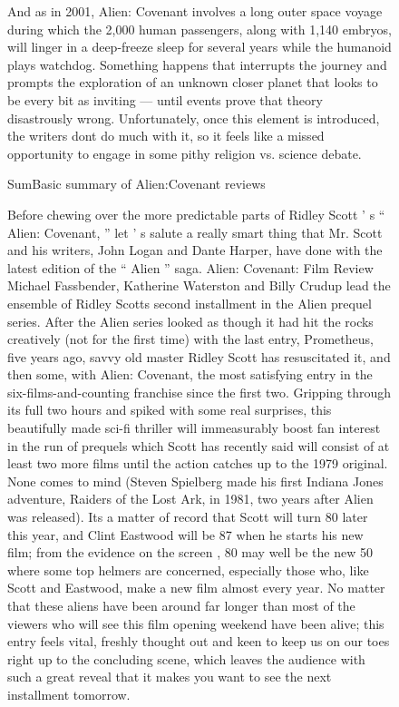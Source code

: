 \documentclass[../writeup.tex]{subfiles}
\begin{document}
\begin{figure}[h]
{        And as in 2001, Alien: Covenant involves a long outer space voyage during which the 2,000 human passengers, along with 1,140 embryos, will linger in a deep-freeze sleep for several years while the humanoid plays watchdog.
        Something happens that interrupts the journey and prompts the exploration of an unknown closer planet that looks to be every bit as inviting — until events prove that theory disastrously wrong.
        Unfortunately, once this element is introduced, the writers dont do much with it, so it feels like a missed opportunity to engage in some pithy religion vs. science debate.}
    \caption{SumBasic summary of Alien:Covenant reviews}
\end{figure}

\begin{figure}[h]
    {\small Before chewing over the more predictable parts of Ridley Scott ’ s “ Alien: Covenant, ” let ’ s salute a really smart thing that Mr. Scott and his writers, John Logan and Dante Harper, have done with the latest edition of the “ Alien ” saga.
        Alien: Covenant: Film Review Michael Fassbender, Katherine Waterston and Billy Crudup lead the ensemble of Ridley Scotts second installment in the Alien prequel series.
        After the Alien series looked as though it had hit the rocks creatively (not for the first time) with the last entry, Prometheus, five years ago, savvy old master Ridley Scott has resuscitated it, and then some, with Alien: Covenant, the most satisfying entry in the six-films-and-counting franchise since the first two.
        Gripping through its full two hours and spiked with some real surprises, this beautifully made sci-fi thriller will immeasurably boost fan interest in the run of prequels which Scott has recently said will consist of at least two more films until the action catches up to the 1979 original.
        None comes to mind (Steven Spielberg made his first Indiana Jones adventure, Raiders of the Lost Ark, in 1981, two years after Alien was released).
        Its a matter of record that Scott will turn 80 later this year, and Clint Eastwood will be 87 when he starts his new film; from the evidence on the screen , 80 may well be the new 50 where some top helmers are concerned, especially those who, like Scott and Eastwood, make a new film almost every year.
        No matter that these aliens have been around far longer than most of the viewers who will see this film opening weekend have been alive; this entry feels vital, freshly thought out and keen to keep us on our toes right up to the concluding scene, which leaves the audience with such a great reveal that it makes you want to see the next installment tomorrow.
}
\end{figure}
\end{document}
